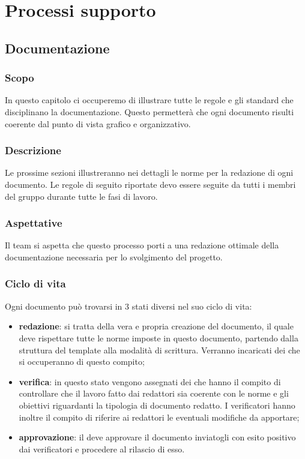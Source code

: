 \section{Processi supporto}

\subsection{Documentazione} \label{_processoDiDocumentazione}

\subsubsection{Scopo}
In questo capitolo ci occuperemo di illustrare tutte le regole e gli standard che disciplinano la documentazione. Questo permetterà che ogni documento risulti coerente dal punto di vista grafico e organizzativo.

\subsubsection{Descrizione}
Le prossime sezioni illustreranno nei dettagli le norme per la redazione di ogni documento.
Le regole di seguito riportate devo essere seguite da tutti i membri del gruppo durante tutte le fasi di lavoro.

\subsubsection{Aspettative}
Il team si aspetta che questo processo porti a una redazione ottimale della documentazione necessaria per lo svolgimento del progetto.

\subsubsection{Ciclo di vita}
Ogni documento può trovarsi in 3 stati diversi nel suo ciclo di vita:
\begin{itemize}
    \item\textbf{redazione}: si tratta della vera e propria creazione del documento, il quale deve rispettare tutte le norme imposte in questo documento, partendo dalla struttura del template alla modalità di scrittura. Verranno incaricati dei  che si occuperanno di questo compito;
    \item\textbf{verifica}: in questo stato vengono assegnati dei  che hanno il compito di controllare che il lavoro fatto dai redattori sia coerente con le norme e gli obiettivi riguardanti la tipologia di documento redatto. I verificatori hanno inoltre il compito di riferire ai redattori le eventuali modifiche da apportare;
    \item\textbf{approvazione}: il  deve approvare il documento inviatogli con esito positivo dai verificatori e procedere al rilascio di esso.
\end{itemize}

